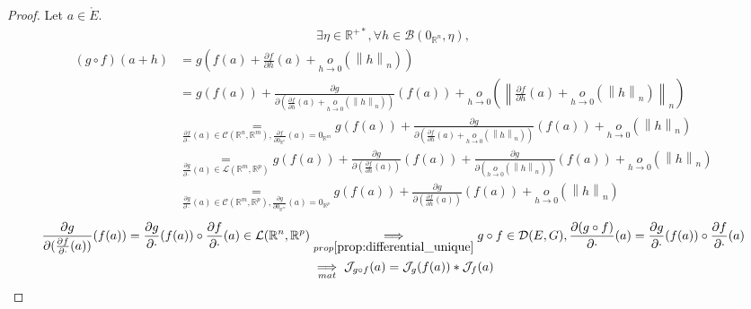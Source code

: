 \documentclass[11pt,en]{elegantpaper}
\newcommand{\norm}[1]{\left\lVert#1\right\rVert}
\newcommand{\Real}{\mathbb{R}}
\begin{document}
\begin{proof}
  Let $a \in \mathring{E}$.
  \begin{equation*}
    \begin{gathered}
      \exists \eta \in \Real^{+*}, \forall h \in \mathcal{B}(0_{\Real^n},\eta),
    \end{gathered}
  \end{equation*}
  \begin{equation*}
    \begin{split}
      (g \circ f)(a+h) & = g(f(a) + \frac{\partial f}{\partial h}(a) + \underset{h \to 0}o(\norm h _n)) \\
      & = g(f(a)) + \frac{\partial g}{\partial (\frac{\partial f}{\partial h}(a) + \underset{h \to 0}o(\norm h _n))}(f(a))
        + \underset{h \to 0}o(\norm{\frac{\partial f}{\partial h}(a) + \underset{h \to 0}o(\norm h _n)}_n) \\
      & \underset{\frac{\partial f}{\partial \cdot}(a) \in \mathcal{C}(\Real^n,\Real^m),\frac{\partial f}{\partial 0_{\Real^n}}(a) = 0_{\Real^m}}
        = g(f(a)) + \frac{\partial g}{\partial (\frac{\partial f}{\partial h}(a) + \underset{h \to 0}o(\norm h _n))}(f(a)) + \underset{h \to 0}o(\norm h _n) \\
      & \underset{\frac{\partial g}{\partial \cdot}(a) \in \mathcal{L}(\Real^m,\Real^p)}
        = g(f(a)) + \frac{\partial g}{\partial (\frac{\partial f}{\partial h}(a))}(f(a)) + \frac{\partial g}{\partial (\underset{h \to 0}o(\norm h _n))}(f(a)) + \underset{h \to 0}o(\norm h _n) \\
      & \underset{\frac{\partial g}{\partial \cdot}(a) \in \mathcal{C}(\Real^m,\Real^p),\frac{\partial g}{\partial 0_{\Real^m}}(a) = 0_{\Real^p}}
        = g(f(a)) + \frac{\partial g}{\partial (\frac{\partial f}{\partial h}(a))}(f(a)) + \underset{h \to 0}o(\norm h _n)
    \end{split}
  \end{equation*}
  \begin{equation*}
    \begin{split}
      \frac{\partial g}{\partial (\frac{\partial f}{\partial \cdot}(a))}(f(a)) = \frac{\partial g}{\partial \cdot}(f(a)) \circ \frac{\partial f}{\partial \cdot}(a) \in \mathcal{L}(\Real^n, \Real^p)
      & \underset{prop\ref{prop:differential_unique}}\implies g \circ f \in \mathcal{D}(E,G), \frac{\partial (g \circ f)}{\partial \cdot}(a) = \frac{\partial g}{\partial \cdot}(f(a)) \circ \frac{\partial f}{\partial \cdot}(a) \\
      & \underset{mat}\implies \mathcal{J}_{g \circ f}(a) = \mathcal{J}_{g}(f(a)) * \mathcal{J}_{f}(a)
    \end{split}
  \end{equation*}
\end{proof}
\end{document}
